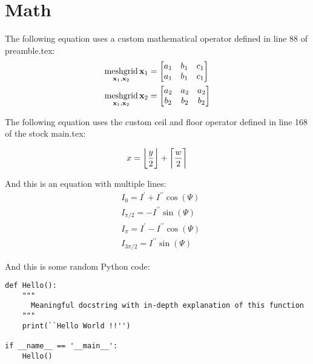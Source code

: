 \section{Math}

The following equation uses a custom mathematical operator defined in line 88
of preamble.tex:
\begin{equation}
\begin{aligned}
            \meshgrid_{\mathbf{x}_{1},\mathbf{x}_{2}}\mathbf{x}_{1}&=
            \begin{bmatrix}a_{1} & b_{1} & c_{1}\\
            a_{1} & b_{1} & c_{1}
\end{bmatrix}\\
            \meshgrid_{\mathbf{x}_{1},\mathbf{x}_{2}}\mathbf{x}_{2}&=
            \begin{bmatrix}a_{2} & a_{2} & a_{2}\\
            b_{2} & b_{2} & b_{2}
\end{bmatrix}
\end{aligned}
\end{equation}

The following equation uses the custom ceil and floor operator defined in line 168 of the stock main.tex:

\begin{equation}
x = \floor*{\frac{y}{2}} + \ceil*{\frac{w}{2}}
\end{equation}


And this is an equation with multiple lines:
\begin{equation}
\begin{aligned}
&I_{0}=I^{\prime}+I^{\prime\prime}\cos(\varPsi)   \\
&I_{\pi/2}=-I^{\prime\prime}\sin(\varPsi)                \\
&I_{\pi}=I^{\prime}-I^{\prime\prime}\cos(\varPsi)   \\
&I_{3\pi/2}=I^{\prime\prime}\sin(\varPsi)
\end{aligned}
\end{equation}

And this is some random Python code:

\begin{lstlisting}[style = Python]
def Hello():
    """
      Meaningful docstring with in-depth explanation of this function
    """
    print(``Hello World !!'')

if __name__ == '__main__':
    Hello()
\end{lstlisting}
